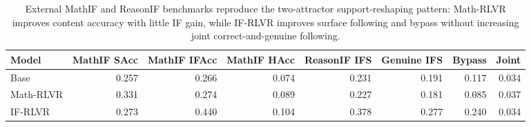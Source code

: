 \begin{table}[t]
\centering
\small
\caption{External MathIF and ReasonIF benchmarks reproduce the two-attractor support-reshaping pattern: Math-RLVR improves content accuracy with little IF gain, while IF-RLVR improves surface following and bypass without increasing joint correct-and-genuine following.}
\label{tab:external-validation}
\begin{tabular}{lrrrrrrr}
\toprule
Model & MathIF SAcc & MathIF IFAcc & MathIF HAcc & ReasonIF IFS & Genuine IFS & Bypass & Joint \\
\midrule
Base & 0.257 & 0.266 & 0.074 & 0.231 & 0.191 & 0.117 & 0.034 \\
Math-RLVR & 0.331 & 0.274 & 0.089 & 0.227 & 0.181 & 0.085 & 0.037 \\
IF-RLVR & 0.273 & 0.440 & 0.104 & 0.378 & 0.277 & 0.240 & 0.034 \\
\bottomrule
\end{tabular}
\end{table}
